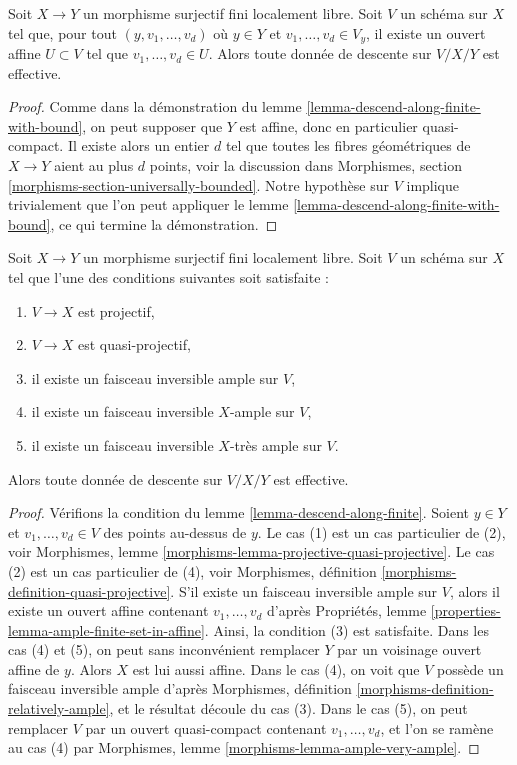 \begin{lemma}
\label{lemma-descend-along-finite}
Soit $X \to Y$ un morphisme surjectif fini localement libre.
Soit $V$ un schéma sur $X$ tel que, pour tout
$(y, v_1, \ldots, v_d)$ où $y \in Y$ et
$v_1, \ldots, v_d \in V_y$, il existe un ouvert affine
$U \subset V$ tel que $v_1, \ldots, v_d \in U$.
Alors toute donnée de descente sur $V/X/Y$ est effective.
\end{lemma}

\begin{proof}
Comme dans la démonstration du lemme \ref{lemma-descend-along-finite-with-bound}, on
peut supposer que $Y$ est affine, donc en particulier quasi-compact. Il
existe alors un entier $d$ tel que toutes les fibres géométriques de $X \to Y$
aient au plus $d$ points, voir la discussion dans Morphismes, section
\ref{morphisms-section-universally-bounded}.
Notre hypothèse sur $V$ implique trivialement que l'on peut appliquer
le lemme \ref{lemma-descend-along-finite-with-bound}, ce qui termine la démonstration.
\end{proof}

\begin{lemma}
\label{lemma-descend-along-finite-quasi-projective}
Soit $X \to Y$ un morphisme surjectif fini localement libre.
Soit $V$ un schéma sur $X$ tel que l'une des conditions suivantes soit satisfaite :
\begin{enumerate}
\item $V \to X$ est projectif,
\item $V \to X$ est quasi-projectif,
\item il existe un faisceau inversible ample sur $V$,
\item il existe un faisceau inversible $X$-ample sur $V$,
\item il existe un faisceau inversible $X$-très ample sur $V$.
\end{enumerate}
Alors toute donnée de descente sur $V/X/Y$ est effective.
\end{lemma}

\begin{proof}
Vérifions la condition du lemme \ref{lemma-descend-along-finite}.
Soient $y \in Y$ et $v_1, \ldots, v_d \in V$ des points au-dessus de $y$.
Le cas (1) est un cas particulier de (2), voir
Morphismes, lemme \ref{morphisms-lemma-projective-quasi-projective}.
Le cas (2) est un cas particulier de (4), voir
Morphismes, définition \ref{morphisms-definition-quasi-projective}.
S'il existe un faisceau inversible ample sur $V$, alors
il existe un ouvert affine contenant $v_1, \ldots, v_d$ d'après
Propriétés, lemme \ref{properties-lemma-ample-finite-set-in-affine}.
Ainsi, la condition (3) est satisfaite.
Dans les cas (4) et (5), on peut sans inconvénient remplacer $Y$ par un
voisinage ouvert affine de $y$.
Alors $X$ est lui aussi affine.
Dans le cas (4), on voit que $V$ possède un faisceau inversible ample
d'après Morphismes, définition \ref{morphisms-definition-relatively-ample},
et le résultat découle du cas (3).
Dans le cas (5), on peut remplacer $V$ par un ouvert quasi-compact contenant
$v_1, \ldots, v_d$, et l'on se ramène au cas (4) par
Morphismes, lemme \ref{morphisms-lemma-ample-very-ample}.
\end{proof}

